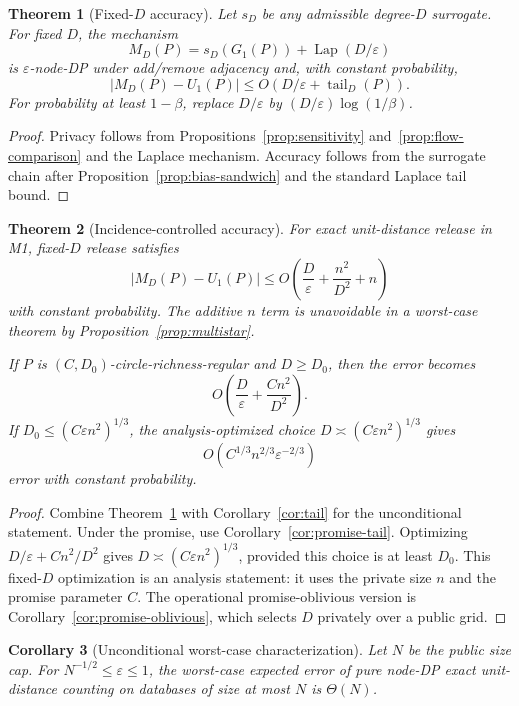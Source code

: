 \documentclass[11pt]{article}
\newtheorem{theorem}{Theorem}[section]
\newtheorem{corollary}[theorem]{Corollary}
\DeclareMathOperator{\Lap}{Lap}
\newcommand{\eps}{\varepsilon}
\newcommand{\tail}{\operatorname{tail}}
\begin{document}
\begin{theorem}[Fixed-\(D\) accuracy]
\label{thm:fixedD}
Let \(s_D\) be any admissible degree-\(D\) surrogate. For fixed \(D\), the mechanism
\[
M_D(P)=s_D(G_1(P))+\Lap(D/\eps)
\]
is \(\eps\)-node-DP under add/remove adjacency and, with constant probability,
\[
|M_D(P)-U_1(P)|\le O(D/\eps+\tail_D(P)).
\]
For probability at least \(1-\beta\), replace \(D/\eps\) by \((D/\eps)\log(1/\beta)\).
\end{theorem}

\begin{proof}
Privacy follows from Propositions~\ref{prop:sensitivity} and~\ref{prop:flow-comparison} and the Laplace mechanism. Accuracy follows from the surrogate chain after Proposition~\ref{prop:bias-sandwich} and the standard Laplace tail bound.
\end{proof}

\begin{theorem}[Incidence-controlled accuracy]
\label{thm:incidence-accuracy}
For exact unit-distance release in M1, fixed-\(D\) release satisfies
\[
|M_D(P)-U_1(P)|\le O\!\left(\frac{D}{\eps}+\frac{n^2}{D^2}+n\right)
\]
with constant probability. The additive \(n\) term is unavoidable in a worst-case theorem by Proposition~\ref{prop:multistar}.

If \(P\) is \((C,D_0)\)-circle-richness-regular and \(D\ge D_0\), then the error becomes
\[
O\!\left(\frac{D}{\eps}+\frac{C n^2}{D^2}\right).
\]
If \(D_0\le (C\eps n^2)^{1/3}\), the analysis-optimized choice \(D\asymp (C\eps n^2)^{1/3}\) gives
\[
O(C^{1/3}n^{2/3}\eps^{-2/3})
\]
error with constant probability.
\end{theorem}

\begin{proof}
Combine Theorem~\ref{thm:fixedD} with Corollary~\ref{cor:tail} for the unconditional statement. Under the promise, use Corollary~\ref{cor:promise-tail}. Optimizing \(D/\eps+Cn^2/D^2\) gives \(D\asymp(C\eps n^2)^{1/3}\), provided this choice is at least \(D_0\). This fixed-\(D\) optimization is an analysis statement: it uses the private size \(n\) and the promise parameter \(C\). The operational promise-oblivious version is Corollary~\ref{cor:promise-oblivious}, which selects \(D\) privately over a public grid.
\end{proof}

\begin{corollary}[Unconditional worst-case characterization]
\label{cor:uncond-theta}
Let \(N\) be the public size cap. For \(N^{-1/2}\le \eps\le 1\), the worst-case expected error of pure node-DP exact unit-distance counting on databases of size at most \(N\) is \(\Theta(N)\).
\end{corollary}
\end{document}
